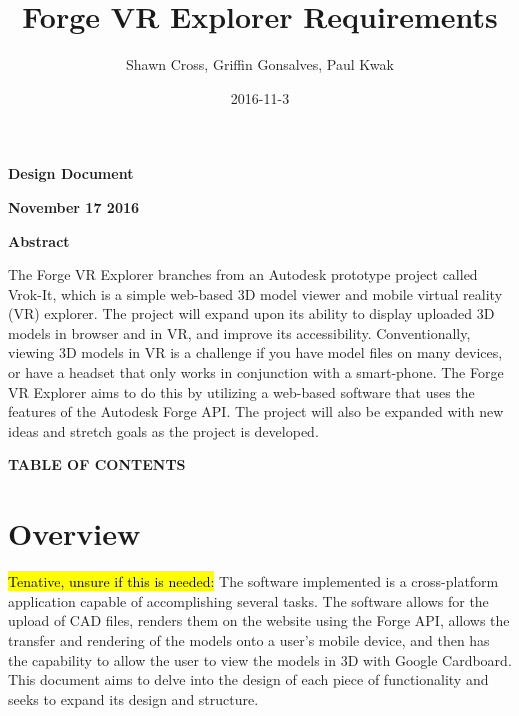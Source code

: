 \documentclass[letterpaper, 10pt, draftclsnofoot, compsoc, onecolumn]{IEEEtran}
\title{Forge VR Explorer Requirements}
\author{Shawn Cross, Griffin Gonsalves, Paul Kwak}
\date{2016-11-3}
\begin{document}
\clearpage\setcounter{page}{1}\pagestyle{Standard}
\thispagestyle{FirstPage}

\bigskip

{\centering{}\bfseries\color{black}
Design Document
\par}


\bigskip

{\centering{}\bfseries\color{black}
November 17 2016
\par}
\bigskip
\bigskip
\bigskip
\bigskip
\bigskip
\bigskip
\bigskip
\bigskip
\bigskip
\bigskip
\bigskip
\bigskip


\vfill
{\centering{}\bfseries\color{black}
Abstract
\par}

{\centering{}\mdseries\color{black}
	The Forge VR Explorer branches from an Autodesk prototype project called Vrok-It, which is a simple web-based 3D 
	model viewer and mobile virtual reality (VR) explorer. The project will expand upon its ability to display uploaded 3D 
	models in browser and in VR, and improve its accessibility. Conventionally, viewing 3D models in VR is a challenge if 
	you have model files on many devices, or have a headset that only works in conjunction with a smart-phone. The 
	Forge VR Explorer aims to do this by utilizing a web-based software that uses the features of the Autodesk Forge API. 
	The project will also be expanded with new ideas and stretch goals as the project is developed.
\par}
\clearpage
{\centering{}\bfseries\color{black}
TABLE OF CONTENTS
\par}

\bigskip

\setcounter{tocdepth}{2}
\renewcommand\contentsname{}
\tableofcontents

\bigskip
\clearpage


\section{Overview}
	\hl{Tenative, unsure if this is needed:} The software implemented is a cross-platform application capable of accomplishing several tasks. The software allows for the upload of CAD files, renders them on the website using the Forge API, allows the transfer and rendering of the models onto a user's mobile device, and then has the capability to allow the user to view the models in 3D with Google Cardboard. This document aims to delve into the design of each piece of functionality and seeks to expand its design and structure.
\end{document}
